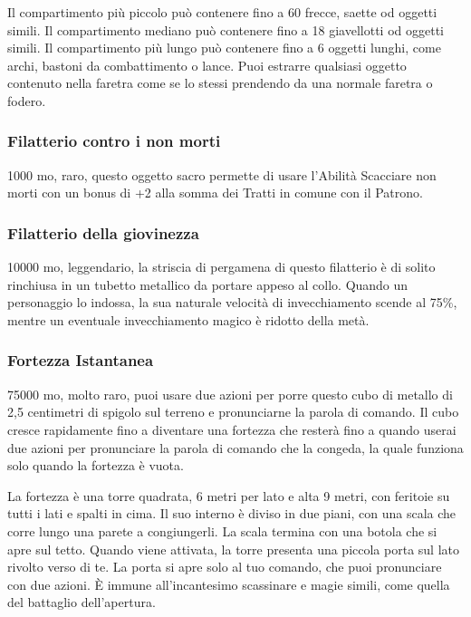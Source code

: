 \begin{multicols}{2}
	Il compartimento più piccolo può contenere fino a 60 frecce, saette od oggetti simili. Il compartimento mediano può contenere fino a 18 giavellotti od oggetti simili. Il compartimento più lungo può contenere fino a 6 oggetti lunghi, come archi, bastoni da combattimento o lance. Puoi estrarre qualsiasi oggetto contenuto nella faretra come se lo stessi prendendo da una normale faretra o fodero.

	\subsubsection*{Filatterio contro i non morti}
	1000 mo, raro, questo oggetto sacro permette di usare l'Abilità Scacciare non morti con un bonus di +2 alla somma dei Tratti in comune con il Patrono.

	\subsubsection*{Filatterio della giovinezza}
	10000 mo, leggendario, la striscia di pergamena di questo filatterio è di solito rinchiusa in un tubetto metallico da portare appeso al collo. Quando un personaggio lo indossa, la sua naturale velocità di invecchiamento scende al 75\%, mentre un eventuale invecchiamento magico è ridotto della metà.

	\subsubsection*{Fortezza Istantanea}
	75000 mo, molto raro, puoi usare due azioni per porre questo cubo di metallo di 2,5 centimetri di spigolo sul terreno e pronunciarne la parola di comando. Il cubo cresce rapidamente fino a diventare una fortezza che resterà fino a quando userai due azioni per pronunciare la parola di comando che la congeda, la quale funziona solo quando la fortezza è vuota.

	La fortezza è una torre quadrata, 6 metri per lato e alta 9 metri, con feritoie su tutti i lati e spalti in cima. Il suo interno è diviso in due piani, con una scala che corre lungo una parete a congiungerli. La scala termina con una botola che si apre sul tetto. Quando viene attivata, la torre presenta una piccola porta sul lato rivolto verso di te. La porta si apre solo al tuo comando, che puoi pronunciare con due azioni. È immune all'incantesimo scassinare e magie simili, come quella del battaglio dell'apertura.


\end{multicols}
